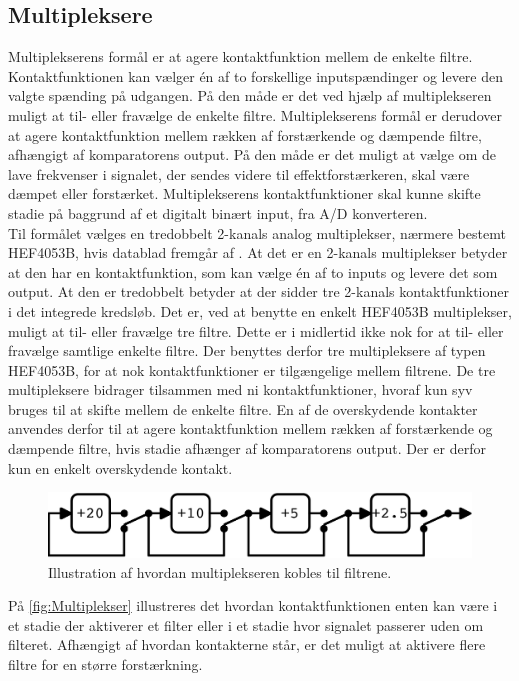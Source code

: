 \subsection{Multipleksere}
\label{Multipleksere}
%
Multiplekserens formål er at agere kontaktfunktion mellem de enkelte filtre. Kontaktfunktionen kan vælger én af to forskellige inputspændinger og levere den valgte spænding på udgangen. På den måde er det ved hjælp af multiplekseren muligt at til- eller fravælge de enkelte filtre. Multiplekserens formål er derudover at agere kontaktfunktion mellem rækken af forstærkende og dæmpende filtre, afhængigt af komparatorens output. På den måde er det muligt at vælge om de lave frekvenser i signalet, der sendes videre til effektforstærkeren, skal være dæmpet eller forstærket. Multiplekserens kontaktfunktioner skal kunne skifte stadie på baggrund af et digitalt binært input, fra A/D konverteren.\\[5mm]
%
Til formålet vælges en tredobbelt 2-kanals analog multiplekser, nærmere bestemt HEF4053B, hvis datablad fremgår af \textcite{PDF:Multiplekser}. At det er en 2-kanals multiplekser betyder at den har en kontaktfunktion, som kan vælge én af to inputs og levere det som output. At den er tredobbelt betyder at der sidder tre 2-kanals kontaktfunktioner i det integrede kredsløb. Det er, ved at benytte en enkelt HEF4053B multiplekser, muligt at til- eller fravælge tre filtre. Dette er i midlertid ikke nok for at til- eller fravælge samtlige enkelte filtre. Der benyttes derfor tre multipleksere af typen HEF4053B, for at nok kontaktfunktioner er tilgængelige mellem filtrene. De tre multipleksere bidrager tilsammen med ni kontaktfunktioner, hvoraf kun syv bruges til at skifte mellem de enkelte filtre. En af de overskydende kontakter anvendes derfor til at agere kontaktfunktion mellem rækken af forstærkende og dæmpende filtre, hvis stadie afhænger af komparatorens output. Der er derfor kun en enkelt overskydende kontakt.
%
\begin{figure}[H]
	\centering
	\includegraphics[resolution=300,scale=\circuitSize]{Figure/Circuits/Multiplekser.pdf}
	\caption{Illustration af hvordan multiplekseren kobles til filtrene.}
	\label{fig:Multiplekser}
\end{figure}
\noindent
%
På \autoref{fig:Multiplekser} illustreres det hvordan kontaktfunktionen enten kan være i et stadie der aktiverer et filter eller i et stadie hvor signalet passerer uden om filteret. Afhængigt af hvordan kontakterne står, er det muligt at aktivere flere filtre for en større forstærkning. 
 
